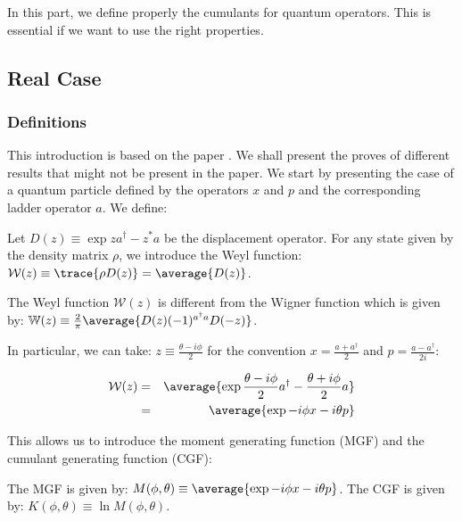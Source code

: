 In this part, we define properly the cumulants for quantum operators. This is essential if we want to use the right properties.

\subsection{Real Case}

\subsubsection{Definitions}

This introduction is based on the paper \cite{Generalized_Cumulant_Dynamics}. We shall present the proves of different results that might not be present in the paper. We start by presenting the case of a quantum particle defined by the operators $x$ and $p$ and the corresponding ladder operator $a$. We define:

\begin{definition}
    Let $D(z) \equiv \exp{z a^\dagger - z^* a}$ be the displacement operator. For any state given by the density matrix $\rho$, we introduce the Weyl function: $\mathcal{W}(z) \equiv \trace{\rho D(z)} = \average{D(z)}$.
\end{definition}

\begin{remark}
    The Weyl function $\mathcal{W}(z)$ is different from the Wigner function which is given by: $\mathbb{W}(z) \equiv \frac{2}{\pi} \average{D(z) (-1)^{a^\dagger a} D(-z)}$.
\end{remark}

In particular, we can take: $z \equiv \frac{\theta - i \phi}{2}$ for the convention $x = \frac{a + a^\dagger}{2}$ and $p = \frac{a - a^\dagger}{2i}$:

\begin{eqnarray}
    \mathcal{W}(z) &=& \average{\exp{\frac{\theta - i \phi}{2} a^\dagger - \frac{\theta + i \phi}{2} a}} \nonumber\\
    &=& \average{\exp{-i \phi x -i \theta p}}
\end{eqnarray}

This allows us to introduce the moment generating function (MGF) and the cumulant generating function (CGF):

\begin{definition}
    The MGF is given by: $M(\phi, \theta) \equiv \average{\exp{-i \phi x -i \theta p}}$. The CGF is given by: $K(\phi, \theta) \equiv \ln{M(\phi, \theta)}$.
\end{definition}

